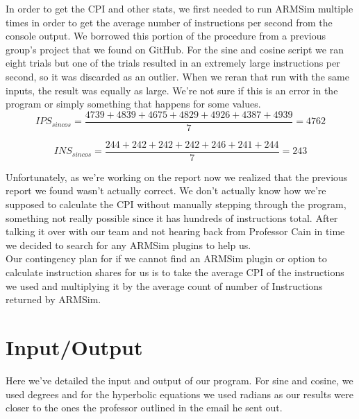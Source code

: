 \documentclass[11pt]{article}
\begin{document}
In order to get the CPI and other stats, we first needed to run ARMSim multiple times in order to get
the average number of instructions per second from the console output. We borrowed this portion of the
procedure from a previous group's project that we found on GitHub.\cite{oldreport} For the sine and
cosine script we ran eight trials but one of the trials resulted in an extremely large instructions
per second, so it was discarded as an outlier. When we reran that run with the same inputs, the result
was equally as large. We're not sure if this is an error in the program or simply something that happens
for some values.\\

\begin{equation}
    IPS_{sincos} = \frac{4739 + 4839 + 4675 + 4829 + 4926 + 4387 + 4939}{7} = 4762
\end{equation}

\begin{equation}
    INS_{sincos} = \frac{244 + 242 + 242 + 242 + 246 + 241 + 244}{7} = 243
\end{equation}

Unfortunately, as we're working on the report now we realized that the previous report we found wasn't
actually correct.\cite{oldreport} We don't actually know how we're supposed to calculate the CPI without
manually stepping through the program, something not really possible since it has hundreds of instructions
total. After talking it over with our team and not hearing back from Professor Cain in time we decided to
search for any ARMSim plugins to help us.\\

Our contingency plan for if we cannot find an ARMSim plugin or option to calculate instruction shares for
us is to take the average CPI of the instructions we used and multiplying it by the average count of number of Instructions returned by ARMSim.

\section{Input/Output}

Here we've detailed the input and output of our program. For sine and cosine, we used degrees and for the
hyperbolic equations we used radians as our results were closer to the ones the professor outlined in the
email he sent out.\cite{profemailresults}
\end{document}
